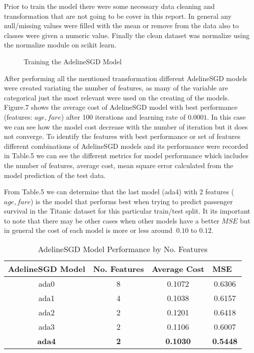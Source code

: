 \documentclass[12pt]{article} %
\begin{document}
Prior to train the model there were some necessary data cleaning and transformation that are not going to be cover in this report. In general any null/missing values were filled with the mean or remove from the data also to classes were given a numeric value. Finally the clean dataset was normalize using the normalize module on scikit learn. 

\begin{figure}[ht]
\caption{Training the AdelineSGD Model}\label{fig:AdelineSGD}
\centering
\end{figure}

After performing all the mentioned transformation different AdelineSGD models were created variating the number of features, as many of the variable are categorical just the most relevant were used on the creating of the models. Figure.7 shows the average cost of AdelineSGD model with best performance (features: $age, fare$) after 100 iterations and learning rate of $0.0001$. In this case we can see how the model cost decrease with the number of iteration but it does not converge. To identify the features with best performance or set of features different combinations of AdelineSGD models and its performance were recorded in Table.5 we can see the different metrics for model performance which includes the number of features, average cost, mean square error calculated from the model prediction of the test data. 

From Table.5 we can determine that the last model (ada4) with 2 features  ($age, fare$) is the model that performs best when trying to predict passenger survival in the Titanic dataset for this particular train/test split. It its important to note that there may be other cases when other models have a better $MSE$ but in general the cost of each model is more or less around $~0.10$ to $0.12$.

\begin{table}[ht]
\centering
\caption{AdelineSGD Model Performance by No. Features}
\begin{tabular}{@{}cccc@{}}
\toprule
\multicolumn{1}{l}{\textbf{AdelineSGD Model}} & \multicolumn{1}{l}{\textbf{No. Features}} & \multicolumn{1}{l}{\textbf{Average Cost}} & \multicolumn{1}{l}{\textbf{MSE}} \\ \midrule
ada0 & 8 & 0.1072 & 0.6306 \\
ada1 & 4 & 0.1038 & 0.6157 \\
ada2 & 2 & 0.1201 & 0.6418 \\
ada3 & 2 & 0.1106 & 0.6007 \\
\textbf{ada4} & \textbf{2} & \textbf{0.1030} & \textbf{0.5448} \\ \bottomrule
\end{tabular}
\end{table}
\end{document}
